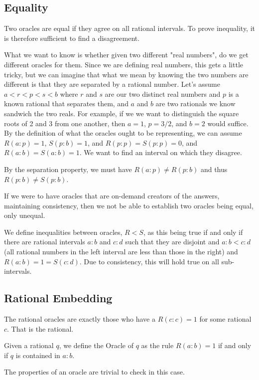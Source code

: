 \documentclass[12pt]{article}
\begin{document}
\subsection{Equality}

Two oracles are equal if they agree on all rational intervals. To prove inequality, it is therefore sufficient to find a disagreement. 

What we want to know is whether given two different "real numbers", do we get different oracles for them. Since we are defining real numbers, this gets a little tricky, but we can imagine that what we mean by knowing the two numbers are different is that they are separated by a rational number. Let's assume $a < r < p < s < b$ where $r$ and $s$ are our two distinct real numbers and $p$ is a known rational that separates them, and $a$ and $b$ are two rationals we know sandwich the two reals. For example, if we we want to distinguish the square roots of 2 and 3 from one another, then $a = 1$, $p = 3/2$, and $b = 2$ would suffice. By the definition of what the oracles ought to be representing, we can assume $R(a:p) = 1$, $S(p:b) = 1$, and $R(p:p) = S(p:p) = 0$, and $R(a:b)=S(a:b) = 1$. We want to find an interval on which they disagree. 

By the separation property, we must have $R(a:p) \neq R(p:b)$ and thus $R(p:b) \neq S(p:b)$. 

If we were to have oracles that are on-demand creators of the answers, maintaining consistency, then we not be able to establish two oracles being equal, only unequal. 

We define inequalities between oracles, $R < S$, as this being true if and only if there are rational intervals $a:b$ and $c:d$ such that they are disjoint and $a:b < c:d$ (all rational numbers in the left interval are less than those in the right) and $R(a:b) = 1 = S(c:d)$. Due to consistency, this will hold true on all sub-intervals. 

\subsection{Rational Embedding}

The rational oracles are exactly those who have a $R(c:c)=1$ for some rational $c$. That is the rational.

Given a rational $q$, we define the Oracle of $q$ as the rule $R(a:b) = 1$ if and only if $q$ is contained in $a:b$. 

The properties of an oracle are trivial to check in this case. 
\end{document}
